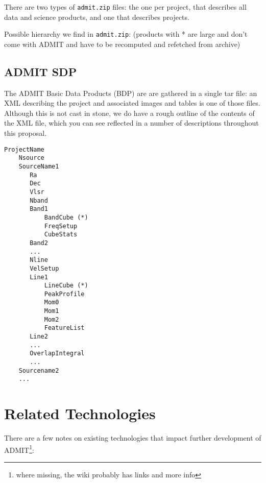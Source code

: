 \documentclass[preprint]{aastex} %
\begin{document}
There are two types of {\tt admit.zip} files: the one per project, that describes
all data and science products, and one that describes projects.

Possible hierarchy we find in {\tt admit.zip}: (products with * are large and don't come
with ADMIT and have to be recomputed and refetched from archive)

\subsection{ADMIT SDP}

The ADMIT Basic Data Products (BDP) are are gathered in a single tar
file: an XML describing the project and associated images and tables
is one of those files. Although this is not cast in stone, we do have
a rough outline of the contents of the XML file, which you can see
reflected in a number of descriptions throughout this proposal.

\footnotesize
\begin{verbatim}
ProjectName
    Nsource
    SourceName1
       Ra
       Dec
       Vlsr
       Nband
       Band1
           BandCube (*)
           FreqSetup
           CubeStats
       Band2
       ...
       Nline
       VelSetup
       Line1
           LineCube (*)
           PeakProfile
           Mom0
           Mom1
           Mom2
           FeatureList
       Line2
       ...
       OverlapIntegral
       ...
    Sourcename2
    ...    
\end{verbatim}
\normalsize


\section{Related Technologies}

There are a few notes on existing technologies that 
impact further development of ADMIT\footnote{where missing, the wiki probably has 
links and more info}:
\end{document}
